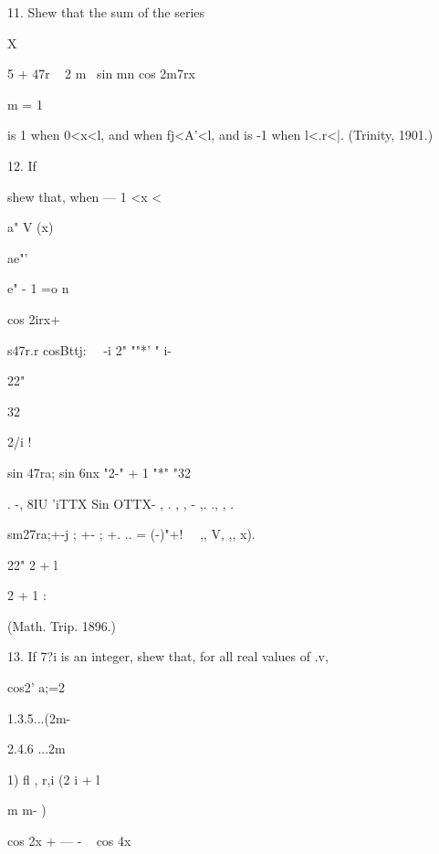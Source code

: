 {11. Shew that the sum of the series 

X 

 5 + 47r ~   2 m~  sin  mn cos 2m7rx 

m = 1 

is 1 when 0<x<l, and when fj<A'<l, and is -1 when l<.r<|. (Trinity, 1901.) 



12. If 



shew that, when — 1 <x <\, 



a" V  (x) 



ae"' 



e" - 1  =o n 



cos 2irx+ 



s47r.r cosBttj: \  \ -i 2" ""*' " i- 



22" 



32 



2/i ! 



sin 47ra; sin 6nx 
"2-" + 1 "*" "32 



. -, 8IU 'iTTX Sin OTTX- , .   , , - ,. ., , . 

sm27ra;+-j ; +- ; +. .. = (-)"+!  \ \ ,, V, ,, x). 



22" 2  + l   

2  + 1 : 



(Math. Trip. 1896.) 



13. If 7?i is an integer, shew that, for all real values of .v, 



cos2' a;=2 



1.3.5...(2m- 



2.4.6 ...2m 



1) fl , r,i 
(2  i + l 



m m- )  

cos 2x + — -  ~ cos 4x 

}
